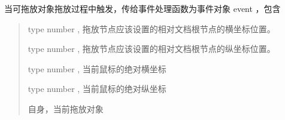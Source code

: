 \documentclass[letterpaper,10pt,english]{sphinxmanual}
\begin{document}

\begin{fulllineitems}
\label{api/component/dd/draggable:DD.Draggable.drag}
当可拖放对象拖放过程中触发，传给事件处理函数为事件对象 event ，包含
\begin{quote}


\begin{fulllineitems}
\label{api/component/dd/draggable:DD.Draggable.drag.event.left}
type number , 拖放节点应该设置的相对文档根节点的横坐标位置。

\end{fulllineitems}



\begin{fulllineitems}
\label{api/component/dd/draggable:DD.Draggable.drag.event.top}
type number , 拖放节点应该设置的相对文档根节点的纵坐标位置。

\end{fulllineitems}



\begin{fulllineitems}
\label{api/component/dd/draggable:DD.Draggable.drag.event.pageX}
type number , 当前鼠标的绝对横坐标

\end{fulllineitems}



\begin{fulllineitems}
\label{api/component/dd/draggable:DD.Draggable.drag.event.pageY}
type number , 当前鼠标的绝对纵坐标

\end{fulllineitems}



\begin{fulllineitems}
\label{api/component/dd/draggable:DD.Draggable.drag.event.drag}
自身，当前拖放对象

\end{fulllineitems}

\end{quote}

\end{fulllineitems}
\end{document}

